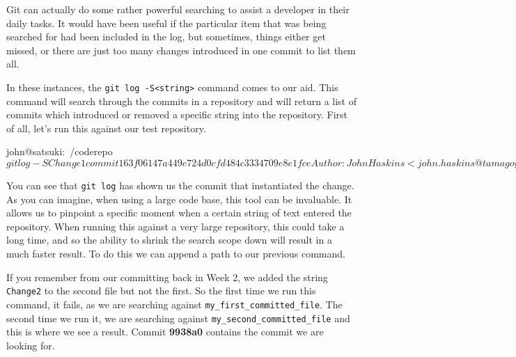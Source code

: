 Git can actually do some rather powerful searching to assist a developer in their daily tasks.
It would have been useful if the particular item that was being searched for had been included in the log, but sometimes, things either get missed, or there are just too many changes introduced in one commit to list them all.

In these instances, the \texttt{git log -S<string>} command comes to our aid.
This command will search through the commits in a repository and will return a list of commits which introduced or removed a specific string into the repository.
First of all, let's run this against our test repository.

\begin{code}
john@satsuki:~/coderepo$ git log -SChange1
commit 163f06147a449e724d0cfd484c3334709e8e1fce
Author: John Haskins <john.haskins@tamagoyakiinc.koala>
Date:   Thu Mar 31 20:32:59 2011 +0100

    Made a few changes to first and second files
john@satsuki:~/coderepo$
\end{code}

You can see that \texttt{git log} has shown us the commit that instantiated the change.
As you can imagine, when using a large code base, this tool can be invaluable.
It allows us to pinpoint a specific moment when a certain string of text entered the repository.
When running this against a very large repository, this could take a long time, and so the ability to shrink the search scope down will result in a much faster result.
To do this we can append a path to our previous command.


If you remember from our committing back in Week 2, we added the string \texttt{Change2} to the second file but not the first.
So the first time we run this command, it fails, as we are searching against \texttt{my\_first\_committed\_file}.
The second time we run it, we are searching against \texttt{my\_second\_committed\_file} and this is where we see a result.
Commit \textbf{9938a0} contains the commit we are looking for.


